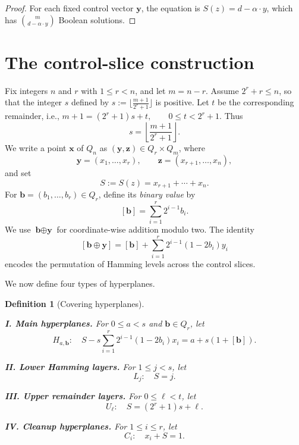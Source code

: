 \documentclass[11pt]{article}
\newtheorem{definition}[theorem]{Definition}
\newcommand{\Q}{Q}
\newcommand{\1}{\mathbf{1}}
\begin{document}
	\begin{proof}
		For each fixed control vector $\textbf{y}$, the equation is $S(z)=d-\alpha\cdot y$, which has $\binom{m}{d-\alpha\cdot y}$ Boolean solutions.
	\end{proof}
	
	\section{The control-slice construction}\label{sec:construction}
	
	Fix integers $n$ and $r$ with $1\le r<n$, and let $m=n-r$.
	Assume $2^r+r\le n$, so that the integer $s$ defined by $s:= \lfloor\frac{m+1}{2^r+1}\rfloor$ is positive.  Let $t$ be the corresponding remainder, i.e., $m+1=(2^r+1)s+t,\qquad 0\le t<2^r+1.$ 
	Thus 
	\[
	s=\left\lfloor\frac{m+1}{2^r+1}\right\rfloor.
	\]
	We write a  point $\textbf{x}$ of $\Q_n$ as $(\textbf{y},\textbf{z})\in\Q_r\times\Q_m$, where
	\[
	\textbf{y}=(x_1,\dots,x_r),\qquad \textbf{z}=(x_{r+1},\dots,x_n),
	\]
	and set
	\[
	S:=S(z)=x_{r+1}+\cdots+x_n.
	\]
	For $\textbf{b}=(b_1,\dots,b_r)\in\Q_r$, define its \textit{binary value} by
	\[
	[\textbf{b}]=\sum_{i=1}^r2^{i-1}b_i.
	\]
	We use $\textbf{b}\oplus \textbf{y}$ for coordinate-wise addition modulo two. The identity
	\begin{equation}\label{eq:xor}
		[\textbf{b}\oplus \textbf{y}]=[\textbf{b}]+\sum_{i=1}^r2^{i-1}(1-2b_i)y_i
	\end{equation}
	encodes the permutation of Hamming levels across the control slices.
	
	We now define four types of hyperplanes.
	\begin{definition}[Covering hyperplanes] \
		
		\noindent\textbf{I. Main hyperplanes.}
		For $0\le a<s$ and $\textbf{b}\in\Q_r$, let
		\begin{equation}\label{eq:main-hyperplane}
			H_{a,\textbf{b}}:\quad
			S-s\sum_{i=1}^r2^{i-1}(1-2b_i)x_i
			=a+s(1+[\textbf{b}]).
		\end{equation}
		
		
		\medskip
		\noindent\textbf{II. Lower Hamming layers.}
		For $1\le j<s$, let
		\begin{equation}\label{eq:lower-layer}
			L_j:\quad S=j.
		\end{equation}
		
		
		\medskip
		\noindent\textbf{III. Upper remainder layers.}
		For $0\le\ell<t$, let
		\begin{equation}\label{eq:upper-layer}
			U_\ell:\quad S=(2^r+1)s+\ell.
		\end{equation}
		
		
		\medskip
		\noindent\textbf{IV. Cleanup hyperplanes.}
		For $1\le i\le r$, let
		\begin{equation}\label{eq:cleanup}
			C_i:\quad x_i+S=1.
		\end{equation}
		
	\end{definition}
	\medskip
	
\end{document}

